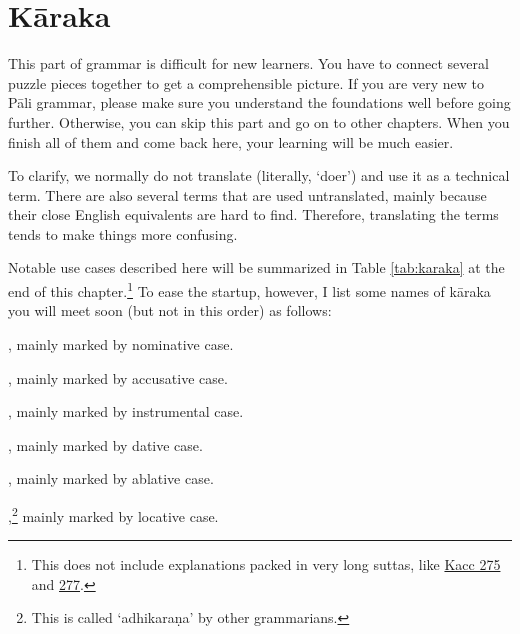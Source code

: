 \chapter{Kāraka}

This part of grammar is difficult for new learners. You have to connect several puzzle pieces together to get a comprehensible picture. If you are very new to Pāli grammar, please make sure you understand the foundations well before going further. Otherwise, you can skip this part and go on to other chapters. When you finish all of them and come back here, your learning will be much easier.

To clarify, we normally do not translate  (literally, `doer') and use it as a technical term. There are also several terms that are used untranslated, mainly because their close English equivalents are hard to find. Therefore, translating the terms tends to make things more confusing.

Notable use cases described here will be summarized in Table \ref{tab:karaka} at the end of this chapter.\footnote{This does not include explanations packed in very long suttas, like \hyperref[sut:275]{Kacc 275} and \hyperref[sut:277]{277}.} To ease the startup, however, I list some names of kāraka you will meet soon (but not in this order) as follows:

\begin{compactitem}
\item {}, mainly marked by nominative case.
\item {}, mainly marked by accusative case.
\item {}, mainly marked by instrumental case.
\item {}, mainly marked by dative case.
\item {}, mainly marked by ablative case.
\item {},\footnote{This is called `adhikaraṇa' by other grammarians.} mainly marked by locative case.
\end{compactitem}


